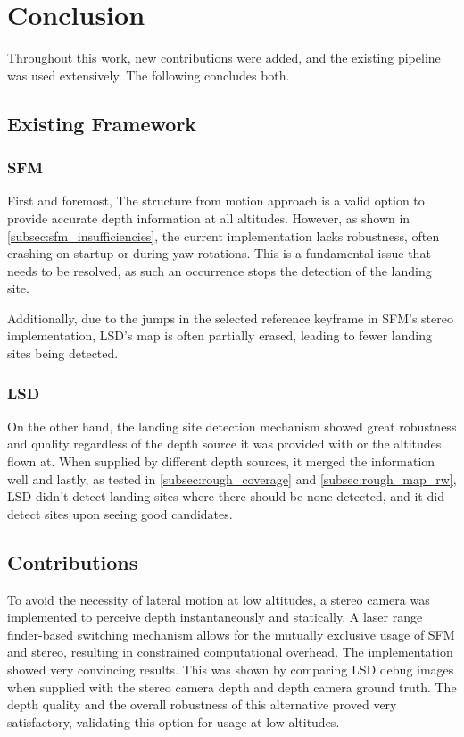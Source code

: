 \chapter{Conclusion}
\label{sec:conclusion}

Throughout this work, new contributions were added, and the existing pipeline was used extensively. The following concludes both.

\section{Existing Framework}

\subsection{SFM}
First and foremost, The structure from motion approach is a valid option to provide accurate depth information at all altitudes. However, as shown in \cref{subsec:sfm_insufficiencies}, the current implementation lacks robustness, often crashing on startup or during yaw rotations. This is a fundamental issue that needs to be resolved, as such an occurrence stops the detection of the landing site.

Additionally, due to the jumps in the selected reference keyframe in SFM's stereo implementation, LSD's map is often partially erased, leading to fewer landing sites being detected.

\subsection{LSD}
On the other hand, the landing site detection mechanism showed great robustness and quality regardless of the depth source it was provided with or the altitudes flown at. When supplied by different depth sources, it merged the information well and lastly, as tested in \cref{subsec:rough_coverage} and \cref{subsec:rough_map_rw}, LSD didn't detect landing sites where there should be none detected, and it did detect sites upon seeing good candidates.



\section{Contributions}

To avoid the necessity of lateral motion at low altitudes, a stereo camera was implemented to perceive depth instantaneously and statically. A laser range finder-based switching mechanism allows for the mutually exclusive usage of SFM and stereo, resulting in constrained computational overhead. The implementation showed very convincing results. This was shown by comparing LSD debug images when supplied with the stereo camera depth and depth camera ground truth. The depth quality and the overall robustness of this alternative proved very satisfactory, validating this option for usage at low altitudes.

